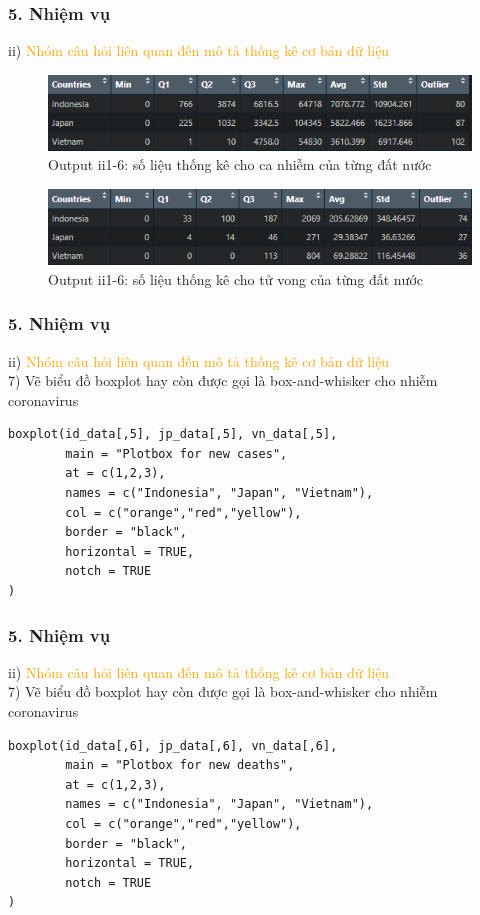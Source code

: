 \documentclass[english,10pt,table]{beamer}
\begin{document}
\begin{frame}[fragile]
\frametitle{5.  Nhiệm vụ}
	ii) \textcolor{orange}{Nhóm câu hỏi liên quan đến mô tả thống kê cơ bản dữ liệu}\\
	\begin{figure}[h!]
	\begin{center}
		    \includegraphics[scale = 0.4]{Images/II/ii1-6.png}
		            \caption{Output ii1-6: số liệu thống kê cho ca nhiễm của từng đất nước}
		\end{center}
		\end{figure}
		\begin{figure}[h!]
	\begin{center}
		    \includegraphics[scale = 0.4]{Images/II/ii1-6''.png}
		            \caption{Output ii1-6: số liệu thống kê cho tử vong của từng đất nước}
		\end{center}
		\end{figure}
\end{frame}

\begin{frame}[fragile]
\frametitle{5.  Nhiệm vụ}
	ii) \textcolor{orange}{Nhóm câu hỏi liên quan đến mô tả thống kê cơ bản dữ liệu}\\
	7) Vẽ biểu đồ boxplot hay còn được gọi là box-and-whisker cho nhiễm coronavirus
 \begin{lstlisting}[frame=single]  
boxplot(id_data[,5], jp_data[,5], vn_data[,5],
        main = "Plotbox for new cases",
        at = c(1,2,3),
        names = c("Indonesia", "Japan", "Vietnam"),
        col = c("orange","red","yellow"),
        border = "black",
        horizontal = TRUE,
        notch = TRUE
)
	\end{lstlisting}
\end{frame}

\begin{frame}[fragile]
\frametitle{5.  Nhiệm vụ}
	ii) \textcolor{orange}{Nhóm câu hỏi liên quan đến mô tả thống kê cơ bản dữ liệu}\\
	7) Vẽ biểu đồ boxplot hay còn được gọi là box-and-whisker cho nhiễm coronavirus
 \begin{lstlisting}[frame=single]  
boxplot(id_data[,6], jp_data[,6], vn_data[,6],
        main = "Plotbox for new deaths",
        at = c(1,2,3),
        names = c("Indonesia", "Japan", "Vietnam"),
        col = c("orange","red","yellow"),
        border = "black",
        horizontal = TRUE,
        notch = TRUE
)
	\end{lstlisting}
\end{frame}
\end{document}

